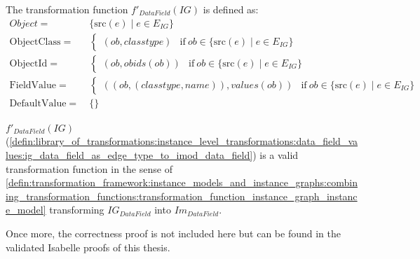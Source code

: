 \begin{defin}
\label{defin:library_of_transformations:instance_level_transformations:data_field_values:ig_data_field_as_edge_type_to_imod_data_field}
The transformation function $f'_{DataField}(IG)$ is defined as:
\begin{align*}
Object =\ &\{\mathrm{src}(e) \mid e \in E_{IG}\} \\
\mathrm{ObjectClass} =\ & \begin{cases}
    (ob, classtype) & \mathrm{if }\ ob \in \{\mathrm{src}(e) \mid e \in E_{IG}\}
\end{cases}\\
\mathrm{ObjectId} =\ & \begin{cases}
    (ob, obids(ob)) & \mathrm{if }\ ob \in \{\mathrm{src}(e) \mid e \in E_{IG}\}
\end{cases}\\
\mathrm{FieldValue} =\ & \begin{cases}
    ((ob, (classtype, name)), values(ob)) & \mathrm{if }\ ob \in \{\mathrm{src}(e) \mid e \in E_{IG}\}
\end{cases} \\
\mathrm{DefaultValue} =\ & \{\}
\end{align*}
\end{defin}

\begin{thm}
\label{defin:library_of_transformations:instance_level_transformations:data_field_values:ig_data_field_as_edge_type_to_tmod_class_func}
$f'_{DataField}(IG)$ (\cref{defin:library_of_transformations:instance_level_transformations:data_field_values:ig_data_field_as_edge_type_to_imod_data_field}) is a valid transformation function in the sense of \cref{defin:transformation_framework:instance_models_and_instance_graphs:combining_transformation_functions:transformation_function_instance_graph_instance_model} transforming $IG_{DataField}$ into $Im_{DataField}$.
\end{thm}

Once more, the correctness proof is not included here but can be found in the validated Isabelle proofs of this thesis.
